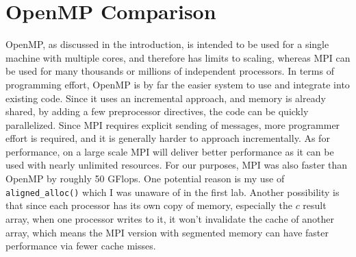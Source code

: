 \documentclass[letterpaper,twocolumn,10pt]{article}
\def\code#1{\texttt{#1}}
\begin{document}
\section{OpenMP Comparison}
OpenMP, as discussed in the introduction, is intended to be used for a single
machine with multiple cores, and therefore has limits to scaling, whereas MPI
can be used for many thousands or millions of independent processors. In terms
of programming effort, OpenMP is by far the easier system to use and integrate
into existing code. Since it uses an incremental approach, and memory is already
shared, by adding a few preprocessor directives, the code can be quickly
parallelized. Since MPI requires explicit sending of messages, more programmer
effort is required, and it is generally harder to approach incrementally. As
for performance, on a large scale MPI will deliver better performance as it can
be used with nearly unlimited resources. For our purposes, MPI was also faster
than OpenMP by roughly 50 GFlops. One potential reason is my use of
\code{aligned\_alloc()} which I was unaware of in the first lab. Another
possibility is that since each processor has its own copy of memory, especially
the $c$ result array, when one processor writes to it, it won't invalidate the
cache of another array, which means the MPI version with segmented memory can
have faster performance via fewer cache misses.
\end{document}
